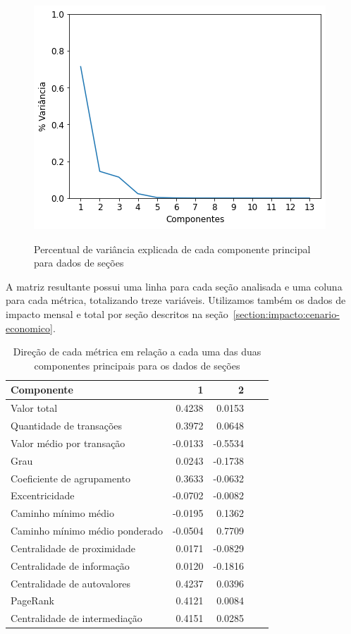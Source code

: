 \begin{figure}[htb]
	\centering
    \caption{Percentual de variância explicada de cada componente principal para dados de seções}
    \includegraphics[scale=0.7]{images/base-de-dados-26.1-pca-components-monthly-secao.png}
    \label{fig:resultados:base-de-dados-24-pca-monthly-secao}
    \fdadospesquisa
\end{figure}

A matriz resultante possui uma linha para cada seção analisada e uma coluna para cada métrica, totalizando treze variáveis. Utilizamos também os dados de impacto mensal e total por seção descritos na seção~\ref{section:impacto:cenario-economico}.

\begin{table}[htb]
\centering
\caption{Direção de cada métrica em relação a cada uma das duas componentes principais para os dados de seções}
\label{tab:resultados:direcao-components-secao}
\begin{tabular}{l|rrrr}
\toprule
Componente & 1 & 2 \\
\midrule
Valor total                    &  0.4238 &  0.0153 \\
Quantidade de transações       &  0.3972 &  0.0648 \\
Valor médio por transação      & -0.0133 & -0.5534 \\
Grau                           &  0.0243 & -0.1738 \\
Coeficiente de agrupamento     &  0.3633 & -0.0632 \\
Excentricidade                 & -0.0702 & -0.0082 \\
Caminho mínimo médio           & -0.0195 &  0.1362 \\
Caminho mínimo médio ponderado & -0.0504 &  0.7709 \\
Centralidade de proximidade    &  0.0171 & -0.0829 \\
Centralidade de informação     &  0.0120 & -0.1816 \\
Centralidade de autovalores    &  0.4237 &  0.0396 \\
PageRank                       &  0.4121 &  0.0084 \\
Centralidade de intermediação  &  0.4151 &  0.0285 \\
\bottomrule
\end{tabular}
\fdadospesquisa
\end{table}

